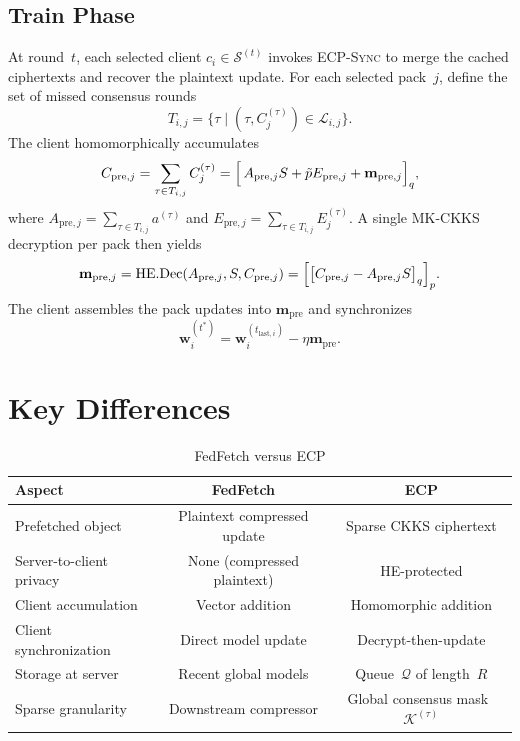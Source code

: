 \documentclass[conference]{IEEEtran}
\DeclareMathOperator{\HE}{HE.Dec}
\begin{document}
\subsection{Train Phase}
At round~$t$, each selected client $c_i \in \mathcal{S}^{(t)}$ invokes \textsc{ECP-Sync} to merge the cached ciphertexts and recover the plaintext update.
For each selected pack~$j$, define the set of missed consensus rounds
\begin{equation}
    T_{i,j} = \bigl\{\tau \mid (\tau, C_j^{(\tau)}) \in \mathcal{L}_{i,j}\bigr\}.
\end{equation}
The client homomorphically accumulates
\begin{equation}
    C_{\mathrm{pre},j}
    = \sum_{\tau\in T_{i,j}} C_j^{(\tau)}
    = \Bigl[\, A_{\mathrm{pre},j} S + \tilde{p} E_{\mathrm{pre},j} + \mathbf{m}_{\mathrm{pre},j} \Bigr]_q,
    \label{eq:ecp-composite}
\end{equation}
where $A_{\mathrm{pre},j}=\sum_{\tau\in T_{i,j}} a^{(\tau)}$ and $E_{\mathrm{pre},j}=\sum_{\tau\in T_{i,j}} E_j^{(\tau)}$.
A single MK-CKKS decryption per pack then yields
\begin{equation}
    \mathbf{m}_{\mathrm{pre},j}
    = \HE(A_{\mathrm{pre},j}, S, C_{\mathrm{pre},j})
    = \Bigl[\bigl[ C_{\mathrm{pre},j} - A_{\mathrm{pre},j} S \bigr]_q\Bigr]_p.
    \label{eq:ecp-decrypt}
\end{equation}
The client assembles the pack updates into $\mathbf{m}_{\mathrm{pre}}$ and synchronizes
\begin{equation}
    \mathbf{w}_i^{(t^*)} = \mathbf{w}_i^{(t_{\mathrm{last},i})} - \eta \mathbf{m}_{\mathrm{pre}}.
    \label{eq:ecp-sync}
\end{equation}

\section{Key Differences}

\begin{table}[h]
\centering
\caption{FedFetch versus ECP}
\label{tab:comparison}
\begin{tabular}{@{}lcc@{}}
\toprule
Aspect & FedFetch & ECP \\
\midrule
Prefetched object & Plaintext compressed update & Sparse CKKS ciphertext \\
Server-to-client privacy & None (compressed plaintext) & HE-protected \\
Client accumulation & Vector addition & Homomorphic addition \\
Client synchronization & Direct model update & Decrypt-then-update \\
Storage at server & Recent global models & Queue~$\mathcal{Q}$ of length~$R$ \\
Sparse granularity & Downstream compressor & Global consensus mask~$\mathcal{K}^{(\tau)}$ \\
\bottomrule
\end{tabular}
\end{table}
\end{document}
